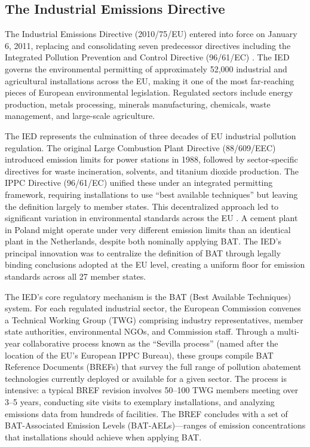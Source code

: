 \documentclass[12pt]{article}
\begin{document}
\subsection{The Industrial Emissions Directive}

The Industrial Emissions Directive (2010/75/EU) entered into force on January 6, 2011, replacing and consolidating seven predecessor directives including the Integrated Pollution Prevention and Control Directive (96/61/EC) \citep{directive2010}. The IED governs the environmental permitting of approximately 52,000 industrial and agricultural installations across the EU, making it one of the most far-reaching pieces of European environmental legislation. Regulated sectors include energy production, metals processing, minerals manufacturing, chemicals, waste management, and large-scale agriculture.

The IED represents the culmination of three decades of EU industrial pollution regulation. The original Large Combustion Plant Directive (88/609/EEC) introduced emission limits for power stations in 1988, followed by sector-specific directives for waste incineration, solvents, and titanium dioxide production. The IPPC Directive (96/61/EC) unified these under an integrated permitting framework, requiring installations to use ``best available techniques'' but leaving the definition largely to member states. This decentralized approach led to significant variation in environmental standards across the EU \citep{european_commission2020}. A cement plant in Poland might operate under very different emission limits than an identical plant in the Netherlands, despite both nominally applying BAT. The IED's principal innovation was to centralize the definition of BAT through legally binding conclusions adopted at the EU level, creating a uniform floor for emission standards across all 27 member states.

The IED's core regulatory mechanism is the BAT (Best Available Techniques) system. For each regulated industrial sector, the European Commission convenes a Technical Working Group (TWG) comprising industry representatives, member state authorities, environmental NGOs, and Commission staff. Through a multi-year collaborative process known as the ``Sevilla process'' (named after the location of the EU's European IPPC Bureau), these groups compile BAT Reference Documents (BREFs) that survey the full range of pollution abatement technologies currently deployed or available for a given sector. The process is intensive: a typical BREF revision involves 50--100 TWG members meeting over 3--5 years, conducting site visits to exemplary installations, and analyzing emissions data from hundreds of facilities. The BREF concludes with a set of BAT-Associated Emission Levels (BAT-AELs)---ranges of emission concentrations that installations should achieve when applying BAT.
\end{document}
